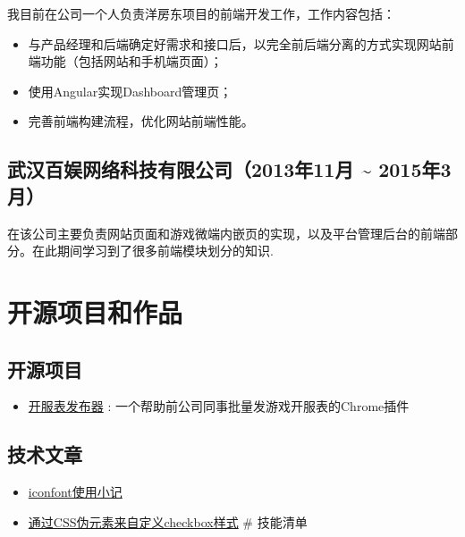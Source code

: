 我目前在公司一个人负责洋房东项目的前端开发工作，工作内容包括：

\begin{itemize}
\tightlist
\item
  与产品经理和后端确定好需求和接口后，以完全前后端分离的方式实现网站前端功能（包括网站和手机端页面）；
\item
  使用Angular实现Dashboard管理页；
\item
  完善前端构建流程，优化网站前端性能。
\end{itemize}

\subsection{武汉百娱网络科技有限公司（2013年11月 \textasciitilde{}
2015年3月）}\label{ux6b66ux6c49ux767eux5a31ux7f51ux7edcux79d1ux6280ux6709ux9650ux516cux53f82013ux5e7411ux6708-2015ux5e743ux6708}

在该公司主要负责网站页面和游戏微端内嵌页的实现，以及平台管理后台的前端部分。在此期间学习到了很多前端模块划分的知识.

\section{开源项目和作品}\label{ux5f00ux6e90ux9879ux76eeux548cux4f5cux54c1}

\subsection{开源项目}\label{ux5f00ux6e90ux9879ux76ee}

\begin{itemize}
\tightlist
\item
  \href{http://github.com/lf2941270/kaifu}{开服表发布器} :
  一个帮助前公司同事批量发游戏开服表的Chrome插件
\end{itemize}

\subsection{技术文章}\label{ux6280ux672fux6587ux7ae0}

\begin{itemize}
\tightlist
\item
  \href{http://www.afanweb.com/2015/06/29/iconfontshi-yong-bi-ji/}{iconfont使用小记}
\item
  \href{http://www.afanweb.com/2015/05/01/tong-guo-csswei-lei-lai-zi-ding-yi-checkboxyang-shi/}{通过CSS伪元素来自定义checkbox样式}
  \# 技能清单
\end{itemize}

